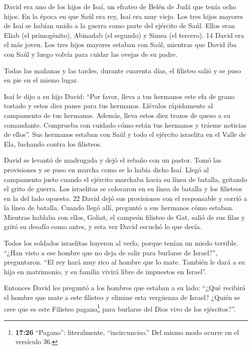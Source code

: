  David era uno de los hijos de Isaí, un efrateo de Belén de
Judá que tenía ocho hijos. En la época en que Saúl era rey, Isaí era muy
viejo.  Los tres hijos mayores de Isaí se habían unido a la
guerra como parte del ejército de Saúl. Ellos eran Eliab (el
primogénito), Abinadab (el segundo) y Simea (el tercero). 14 David era
el más joven. Los tres hijos mayores estaban con Saúl, 
mientras que David iba con Saúl y luego volvía para cuidar las ovejas de
su padre.

 Todas las mañanas y las tardes, durante cuarenta días, el
filisteo salió y se puso en pie en el mismo lugar.

 Isaí le dijo a su hijo David: ``Por favor, lleva a tus
hermanos este efa de grano tostado y estos diez panes para tus hermanos.
Llévalos rápidamente al campamento de tus hermanos. 
Además, lleva estos diez trozos de queso a su comandante. Comprueba con
cuidado cómo están tus hermanos y tráeme noticias de ellos''.
 Sus hermanos estaban con Saúl y todo el ejército israelita
en el Valle de Ela, luchando contra los filisteos.

 David se levantó de madrugada y dejó el rebaño con un
pastor. Tomó las provisiones y se puso en marcha como se lo había dicho
Isaí. Llegó al campamento justo cuando el ejército marchaba hacia su
línea de batalla, gritando el grito de guerra.  Los
israelitas se colocaron en su línea de batalla y los filisteos en la del
lado opuesto. 22 David dejó sus provisiones con el responsable y corrió
a la línea de batalla. Cuando llegó allí, preguntó a sus hermanos cómo
estaban.  Mientras hablaba con ellos, Goliat, el campeón
filisteo de Gat, salió de sus filas y gritó su desafío como antes, y
esta vez David escuchó lo que decía.

 Todos los soldados israelitas huyeron al verlo, porque
tenían un miedo terrible.  ``¿Han visto a ese hombre que no
deja de salir para burlarse de Israel?'', preguntaron. ``El rey hará muy
rico al hombre que lo mate. También le dará a su hija en matrimonio, y
su familia vivirá libre de impuestos en Israel''.

 Entonces David les preguntó a los hombres que estaban a su
lado: ``¿Qué recibirá el hombre que mate a este filisteo y elimine esta
vergüenza de Israel? ¿Quién se cree que es este Filisteo
pagano\footnote{\textbf{17:26} ``Pagano'': literalmente,
  ``incircunciso.'' Del mismo modo ocurre en el versículo 36.} para
burlarse del Dios vivo de los ejércitos?''.

